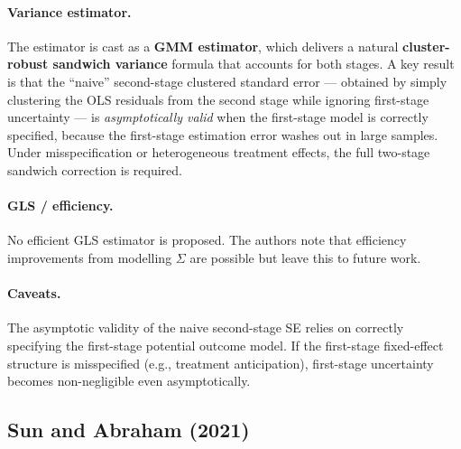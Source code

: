 \documentclass[12pt]{article}
\begin{document}
\paragraph{Variance estimator.}
The estimator is cast as a \textbf{GMM estimator}, which delivers a natural
\textbf{cluster-robust sandwich variance} formula that accounts for both stages.
A key result is that the ``naive'' second-stage clustered standard error ---
obtained by simply clustering the OLS residuals from the second stage while
ignoring first-stage uncertainty --- is \textit{asymptotically valid} when the
first-stage model is correctly specified, because the first-stage estimation
error washes out in large samples.
Under misspecification or heterogeneous treatment effects, the full two-stage
sandwich correction is required.

\paragraph{GLS / efficiency.}
No efficient GLS estimator is proposed.
The authors note that efficiency improvements from modelling $\Sigma$ are
possible but leave this to future work.

\paragraph{Caveats.}
The asymptotic validity of the naive second-stage SE relies on correctly
specifying the first-stage potential outcome model.
If the first-stage fixed-effect structure is misspecified (e.g., treatment
anticipation), first-stage uncertainty becomes non-negligible even asymptotically.

\subsection{Sun and Abraham (2021)}
\end{document}
